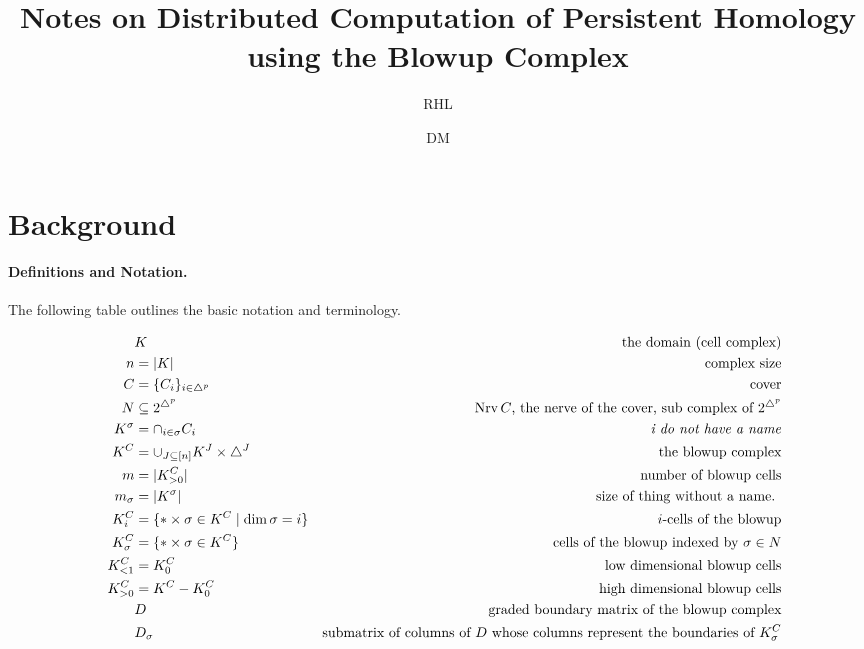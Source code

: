 \documentclass{article}
\title{Notes on Distributed Computation of Persistent Homology\\
        using the Blowup Complex}
\author{RHL \and DM}
\newcommand{\Nrv}   {\operatorname{Nrv}}
\newcommand{\ssx}   {\sigma}
\newcommand{\smplx} {\triangle}
\begin{document}
\maketitle

\section{Background}

\paragraph{Definitions and Notation.}
The following table outlines the basic notation and terminology.
\vspace{2ex}

\begin{align*}
    && &K                      &   \text{the domain (cell complex)}            \\
    &&n & = |K|           &    \textrm{ complex size} \\
    &&C     &  = \{C_i\}_{i \in \smplx^{p}}      &   \text{cover}                                \\
    &&N &\subseteq 2^{\smplx^{p}}    &                  \text{$\Nrv C$, the nerve of the cover, sub complex of $2^{\smplx^p}$}     \\
    &&K^{\ssx} &= \cap_{i \in \ssx} C_i  & \text{\emph{i do not have a name}}     \\
    &&K^C   & = \cup_{J \subseteq [n]} K^J \times \smplx^J &   \text{the blowup complex}  \\
    &&m & = |K^C_{>0}|    &    \text{ number of blowup cells} \\
    &&m_{\ssx} & = |K^{\ssx}| & \text{  size of thing without a name. }\\
    &&K^C_i & = \{ * \times \ssx \in K^C \mid \dim \ssx = i \} & \text{ $i$-cells of the blowup}             \\
    &&K^C_\sigma & = \{ * \times \ssx \in K^C \} & \text{ cells of the blowup indexed by $\sigma \in N$}             \\
    &&K^C_{<1} & =  K^C_0               &  \text{low dimensional blowup cells}        \\
    &&K^C_{>0} & = K^C - K^C_0               &  \text{high dimensional blowup cells}                               \\
    && & D  \phantom{=}               & \text{graded boundary matrix of the blowup complex}  \\
    && & D_{\ssx}               & \text{submatrix of columns of $D$ whose columns represent the boundaries of $K^C_\sigma$} \\

\end{align*}
\end{document}
